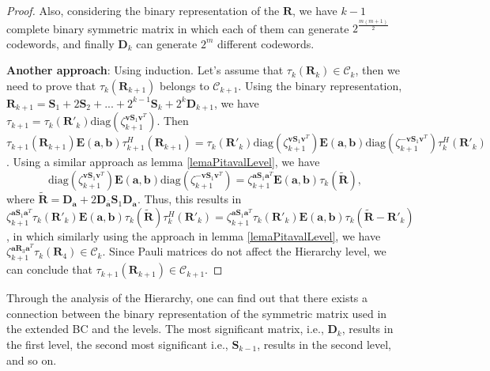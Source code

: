 \documentclass[lettersize,journal,onecolumn]{IEEEtran}
\begin{document}
\begin{proof}
Also, considering the binary representation of the $\mathbf{R}$, we have $k-1$ complete binary symmetric matrix in which each of them can generate $2^{\frac{m(m+1)}{2}}$ codewords, and finally $\mathbf{D}_k$ can generate $2^m$ different codewords. 

\textbf{Another approach}: Using  induction. Let's assume that $\tau_k\left(\mathbf{R}_k\right) \in \mathcal{C}_k$, then we need to prove that $\tau_k\left(\mathbf{R}_{k+1}\right)$ belongs to $\mathcal{C}_{k+1}$. Using the binary representation, $\mathbf{R}_{k+1}=\mathbf{S}_1+2\mathbf{S}_2+...+2^{k-1}\mathbf{S}_{k}+2^k \mathbf{D}_{k+1}$, we have $\tau_{k+1}=\tau_{k}(\mathbf{R}'_k)\text{diag}\left(\zeta_{k+1}^{\mathbf{v}\mathbf{S}_1 \mathbf{v}^T}\right)$. Then $\tau_{k+1}(\mathbf{R}_{k+1})\mathbf{E}\left(\mathbf{a,b}\right)\tau_{k+1}^H(\mathbf{R}_{k+1}) = \tau_k\left(\mathbf{R}'_k\right) \text{diag}\left(\zeta_{k+1}^{\mathbf{v}\mathbf{S}_1\mathbf{v}^T} \right) \mathbf{E}\left(\mathbf{a,b}\right) \text{diag}\left(\zeta_{k+1}^{-\mathbf{v}\mathbf{S}_1 \mathbf{v}^T} \right)\tau_k^H\left(\mathbf{R}'_k\right)$. Using a similar approach as lemma \ref{lemaPitavalLevel}, we have
\begin{equation*}
	\text{diag}\left(\zeta_{k+1}^{\mathbf{v}\mathbf{S}_1\mathbf{v}^T} \right) \mathbf{E}\left(\mathbf{a,b}\right) \text{diag}\left(\zeta_{k+1}^{-\mathbf{v}\mathbf{S}_1 \mathbf{v}^T} \right) = \zeta_{k+1}^{\mathbf{a}\mathbf{S}_1 \mathbf{a}^T}\mathbf{E}\left(\mathbf{a,b}\right)\tau_{k}\left(\widetilde{\mathbf{R}}\right),
\end{equation*}
where $\widetilde{\mathbf{R}} = \mathbf{D}_{\mathbf{a}}+2\mathbf{D}_{\overline{\mathbf{a}}}\mathbf{S}_1 \mathbf{D}_{\mathbf{a}}$. Thus, this results in $\zeta_{k+1}^{\mathbf{a}\mathbf{S}_1 \mathbf{a}^T} \tau_k\left(\mathbf{R}'_k\right)  \mathbf{E}\left(\mathbf{a,b}\right) \tau_{k}\left(\widetilde{\mathbf{R}}\right) \tau_k^H\left(\mathbf{R}'_k\right)=\zeta_{k+1}^{\mathbf{a}\mathbf{S}_1 \mathbf{a}^T} \tau_k\left(\mathbf{R}'_k\right)  \mathbf{E}\left(\mathbf{a,b}\right) \tau_{k}\left(\widetilde{\mathbf{R}}-\mathbf{R}'_k\right)$, in which similarly using the approach in lemma \ref{lemaPitavalLevel}, we have $\zeta_{k+1}^{\mathbf{a}\mathbf{R}_3 \mathbf{a}^T} \tau_{k}\left(\mathbf{R}_4\right) \in \mathcal{C}_k$. Since Pauli matrices do not affect the Hierarchy level, we can conclude that $\tau_{k+1}\left(\mathbf{R}_{k+1} \right) \in \mathcal{C}_{k+1}$. 
\end{proof}
Through the analysis of the Hierarchy, one can find out that there exists a connection between the binary representation of the symmetric matrix used in the extended BC and the levels. The most significant matrix, i.e., $\mathbf{D}_k$, results in the first level, the second most significant i.e., $\mathbf{S}_{k-1}$, results in the second level, and so on.
\end{document}
